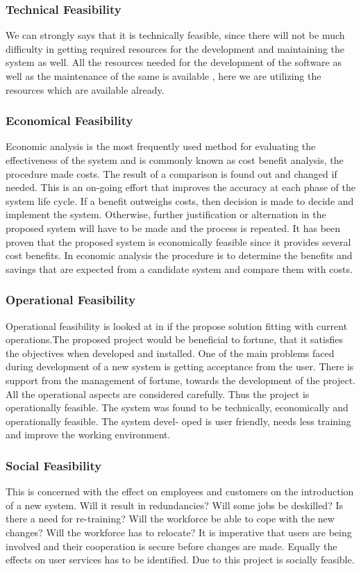 \documentclass[a4paper, 12pt]{report}
\begin{document}
\subsubsection{Technical Feasibility}
We can strongly says that it is technically feasible, since there will not be much diﬃculty in getting required resources for the development and maintaining the system as well. All the resources needed for the development of the software as well as the maintenance of the same is available , here we are utilizing the resources which are available already.
\subsubsection{Economical Feasibility}
Economic analysis is the most frequently used method for evaluating the eﬀectiveness of the system and is commonly known as cost beneﬁt analysis, the procedure made costs. The result of a comparison is found out and changed if needed. This is an on-going eﬀort that improves the accuracy at each phase of the system life cycle. If a beneﬁt outweighs costs, then decision is made to decide and implement the system. Otherwise, further justiﬁcation or alternation in the proposed system will have to be made and the process is repeated. It has been proven that the proposed system is economically feasible since it provides several cost beneﬁts. In economic analysis the procedure is to determine the beneﬁts and savings that are expected from a candidate system and compare them with costs.
\subsubsection{ Operational Feasibility}
Operational feasibility is looked at in if the propose solution ﬁtting with current operations.The proposed project would be beneﬁcial to fortune, that it satisﬁes the objectives when developed and installed. One of the main problems faced during development of a new system is getting acceptance from the user. There is support from the management of fortune, towards the development of the project. All the operational aspects are considered carefully. Thus the project is operationally feasible.
The system was found to be technically, economically and operationally feasible. The system devel- oped is user friendly, needs less training and improve the working environment.

\subsubsection{ Social Feasibility}
This is concerned with the eﬀect on employees and customers on the introduction of a new system. Will it result in redundancies? Will some jobs be deskilled? Is there a need for re-training? Will the workforce be able to cope with the new changes? Will the workforce has to relocate? It is imperative that users are being involved and their cooperation is secure before changes are made. Equally the eﬀects on user services has to be identiﬁed. Due to this project is socially feasible.
\newpage
\end{document}
